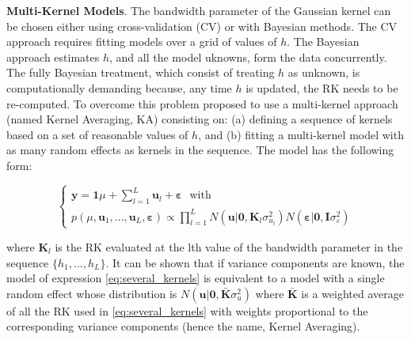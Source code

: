 \documentclass[article,shortnames,nojss]{jss}
\begin{document}
\textbf{Multi-Kernel Models}. The bandwidth parameter of the Gaussian kernel 
can be chosen either using cross-validation 
(CV) or with Bayesian methods. The CV approach requires 
fitting models over a grid of values of $h$. The Bayesian 
approach estimates $h$, and all the model uknowns, form the data concurrently. The fully 
Bayesian treatment, which consist of treating $h$ as unknown, 
is computationally demanding because, any time $h$ is updated, 
the RK needs to be re-computed. To overcome this problem 
\citet{delosCampos:2010b} proposed to use a 
multi-kernel approach (named Kernel Averaging, KA) 
consisting on: (a) defining a sequence of kernels based 
on a set of reasonable values of $h$, and (b) fitting a multi-kernel 
model with as many random effects as kernels in the sequence. 
The model has the following form:

\begin{equation}
\label{eq:several_kernels}
\left\{
    \begin{array}{l}
      \boldsymbol y = \boldsymbol 1 \mu + \sum_{l=1}^L \boldsymbol u_l %
      + \boldsymbol \varepsilon \,\,\,\, \text{with} \\
      p(\mu,\boldsymbol u_1,...,\boldsymbol u_L, \boldsymbol \varepsilon) \propto %
      \prod_{l=1}^L N(\boldsymbol u| \boldsymbol 0, \boldsymbol K_l \sigma_{u_l}^2) %
      N(\boldsymbol \varepsilon | \boldsymbol 0, \boldsymbol I \sigma_\varepsilon^2) 
    \end{array}
  \right.
\end{equation}

where $\boldsymbol K_l$ is the RK evaluated at the 
lth value of the bandwidth parameter in the sequence 
$\{h_1,...,h_L\}$. It can be shown 
\citep[e.g.,][]{delosCampos:2010b} that if variance 
components are known, the model of expression \eqref{eq:several_kernels} 
is equivalent to a model with a single random effect whose 
distribution is $N(\boldsymbol u|\boldsymbol 0,\bar{\boldsymbol K} \sigma_u^2)$ 
where $\bar{\boldsymbol K}$ is a weighted average of all the RK 
used in \eqref{eq:several_kernels} with weights proportional 
to the corresponding variance components (hence the name, Kernel Averaging).
\end{document}
